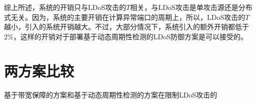 综上所述，系统的开销只与LDoS攻击的$T$相关，与LDoS攻击是单攻击源还是分布式无关。因为，系统的主要开销在计算异常端口的周期上，所以，LDoS攻击的$T$越小，引入的系统开销越大。不过，大部分情况下，系统引入的额外开销都低于2\%，这样的开销对于部署基于动态周期性检测的LDoS防御方案是可以接受的。


\section{两方案比较}
\label{chap05:compare}

基于带宽保障的方案和基于动态周期性检测的方案在限制LDoS攻击的